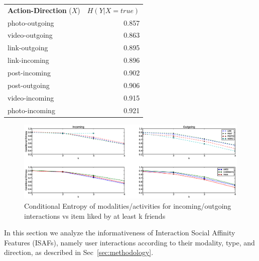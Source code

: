 \begin{table}
{\begin{tabular}{| >{\small}l | >{\small}r | }
		\hline
\multicolumn{2}{c}{}\\
                \hline	
		\textbf{Action-Direction} ($X$) & $H(Y|X=true)$ \\
		\hline
		photo-outgoing & 0.857 \\
		video-outgoing & 0.863 \\
		link-outgoing & 0.895 \\
		link-incoming & 0.896 \\
		post-incoming & 0.902 \\
		post-outgoing & 0.906 \\
		video-incoming & 0.915 \\
		photo-incoming & 0.921 \\
		\hline
				
	\end{tabular}}
\end{table}

\begin{figure}[tbp!]
\hspace{-15mm}\includegraphics[width=210mm]{data/plots/vsk/ModalityActionsvsKFriends.eps}
\caption{Conditional Entropy  of modalities/activities for incoming/outgoing interactions vs item liked by at least k friends}
\label{Fig2}
\end{figure}

In this section we analyze the informativeness of Interaction Social
Affinity Features (ISAFs), namely user interactions according to their
modality, type, and direction, as described in
Sec~\ref{sec:methodology}.

